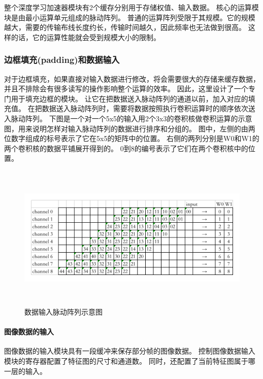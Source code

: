 整个深度学习加速器模块有2个缓存分别用于存储权值、输入数据。
核心的运算模块是由最小运算单元组成的脉动阵列。
普通的运算阵列受限于其规模。它的规模越大，需要的传输布线长度约长，传输时间越久，因此频率也无法做到很高。
这样的话，它的运算性能就会受到规模大小的限制。




\subsubsection{边框填充(padding)和数据输入}
对于边框填充，如果直接对输入数据进行修改，将会需要很大的存储来缓存数据，并且不排除会有很多读写的操作影响整个运算的效率。
因此，这里设计了一个专门用于填充边框的模块。
让它在把数据送入脉动阵列的通道以前，加入对应的填充值。
在把数据送入脉动阵列时，需要将数据按照执行卷积运算时的顺序依次送入脉动阵列。
下图是一个对一个5x5的输入用2个3x3的卷积核做卷积运算的示意图，用来说明怎样对输入脉动阵列的数据进行排序和分组的。
图中，左侧的由两位数字组成的标号表示了它在5x5的矩阵中的位置。
右侧的两列分别是W0和W1的两个卷积核的数据平铺展开得到的。
0到8的编号表示了它们在两个卷积核中的位置。

\begin{figure}[htbp]
    \centering
    \includegraphics[width=15cm,height=7cm]{figures/input_systolic_array.png}
    \caption{数据输入脉动阵列示意图}
    \label{systolic}
\end{figure}


\paragraph{图像数据的输入}
图像数据的输入模块具有一段缓冲来保存部分帧的图像数据。
控制图像数据输入模块的寄存器配置了特征图的尺寸和通道数。
同时，还配置了当前特征图属于哪一层的输入。


